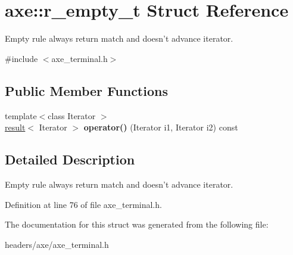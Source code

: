 \hypertarget{structaxe_1_1r__empty__t}{\section{axe\+:\+:r\+\_\+empty\+\_\+t Struct Reference}
\label{structaxe_1_1r__empty__t}
}


Empty rule always return match and doesn't advance iterator.  




{\ttfamily \#include $<$axe\+\_\+terminal.\+h$>$}

\subsection*{Public Member Functions}
\begin{DoxyCompactItemize}
\item 
\hypertarget{structaxe_1_1r__empty__t_ab507e10c56ab40aefc38cced6e421315}{{\footnotesize template$<$class Iterator $>$ }\\\hyperlink{structaxe_1_1result}{result}$<$ Iterator $>$ {\bfseries operator()} (Iterator i1, Iterator i2) const }\label{structaxe_1_1r__empty__t_ab507e10c56ab40aefc38cced6e421315}

\end{DoxyCompactItemize}


\subsection{Detailed Description}
Empty rule always return match and doesn't advance iterator. 

Definition at line 76 of file axe\+\_\+terminal.\+h.



The documentation for this struct was generated from the following file\+:\begin{DoxyCompactItemize}
\item 
headers/axe/axe\+\_\+terminal.\+h\end{DoxyCompactItemize}
